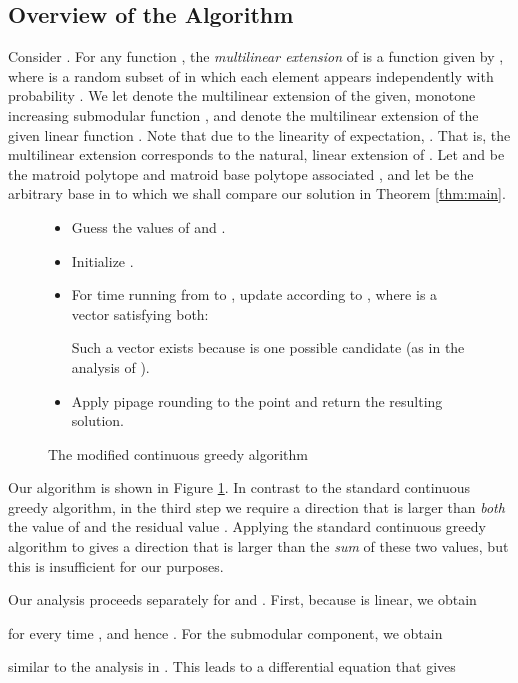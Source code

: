 \documentclass{article}
\theoremstyle{definition}
\begin{document}
\subsection{Overview of the Algorithm}
Consider .  For any function , the \emph{multilinear extension}  of  is a function  given by , where  is a random subset of  in which each element  appears independently with probability .  We let  denote the multilinear extension of the given, monotone increasing submodular function , and  denote the multilinear extension of the given linear function .
Note that due to the linearity of expectation, .  That is, the multilinear extension  corresponds to the natural, linear extension of .  Let  and  be the matroid polytope and matroid base polytope associated , and let  be the arbitrary base in  to which we shall compare our solution in Theorem \ref{thm:main}.
\begin{figure}
\begin{framed}
\begin{itemize}[itemsep=0ex, topsep=0.5ex]
\item Guess the values of  and .
\item Initialize .
\item For time running from  to , update  according to ,
where  is a vector satisfying both:

Such a vector exists because  is one possible candidate (as in the analysis of \cite{Calinescu2011}).
\item Apply pipage rounding to the point  and return the resulting solution.
\end{itemize}
\end{framed}
\caption{The modified continuous greedy algorithm}
\label{fig:cont-greedy-alg}
\end{figure}
Our algorithm is shown in Figure \ref{fig:cont-greedy-alg}.
In contrast to the standard continuous greedy algorithm, in the third step we require a direction that is larger than \emph{both} the value of  and the residual value .  Applying the standard continuous greedy algorithm to  gives a direction that is larger than the \emph{sum} of these two values, but this is insufficient for our purposes.  

Our analysis proceeds separately for  and . First, because  is linear, we obtain

for every time , and hence . For the submodular component, we obtain

similar to the analysis in \cite{Calinescu2011}. This leads to a differential equation that gives
\end{document}
